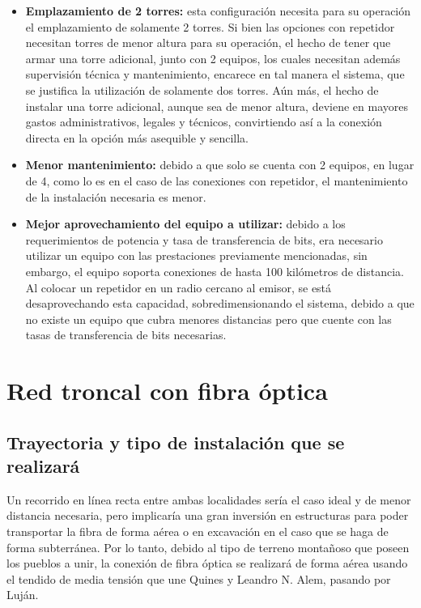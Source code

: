 \documentclass[11pt,a4paper]{article}
\begin{document}
\begin{itemize}
  \item  \textbf{Emplazamiento de 2 torres:} esta configuración necesita para su operación el emplazamiento de solamente 2 torres. 
  Si bien las opciones con repetidor necesitan torres de menor altura para su operación, el hecho de tener que armar una torre adicional, junto con 2 equipos, los cuales necesitan además supervisión técnica y mantenimiento, encarece en tal manera el sistema, que se justifica la utilización de solamente dos torres. 
  Aún más, el hecho de instalar una torre adicional, aunque sea de menor altura, deviene en mayores gastos administrativos, legales y técnicos, convirtiendo así a la conexión directa en la opción más asequible y sencilla.

  \item \textbf{ Menor mantenimiento:} debido a que solo se cuenta con 2 equipos, en lugar de 4, como lo es en el caso de las conexiones con repetidor, el mantenimiento de la instalación necesaria es menor.

  \item \textbf{ Mejor aprovechamiento del equipo a utilizar:} debido a los requerimientos de potencia y tasa de transferencia de bits, era necesario utilizar un equipo con las prestaciones previamente mencionadas, sin embargo, el equipo soporta conexiones de hasta 100 kilómetros de distancia. 
  Al colocar un repetidor en un radio cercano al emisor, se está desaprovechando esta capacidad, sobredimensionando el sistema, debido a que no existe un equipo que cubra menores distancias pero que cuente con las tasas de transferencia de bits necesarias.
\end{itemize}

\section{Red troncal con fibra óptica}

\subsection{Trayectoria y tipo de instalación que se realizará}



Un recorrido en línea recta entre ambas localidades sería el caso ideal y de menor distancia necesaria, pero implicaría una gran inversión en estructuras para poder transportar la fibra de forma aérea o en excavación en el caso que se haga de forma subterránea. 
Por lo tanto, debido al tipo de terreno montañoso que poseen los pueblos a unir, la conexión de fibra óptica se realizará de forma aérea usando el tendido de media tensión que une Quines y Leandro N. Alem, pasando por Luján.
\end{document}
